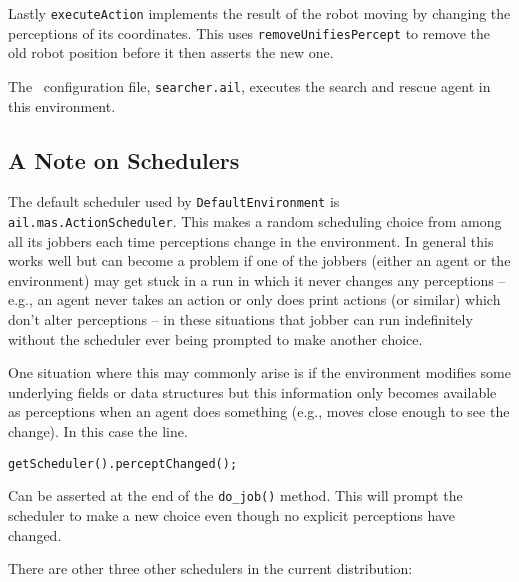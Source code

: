Lastly \texttt{executeAction} implements the result of the robot moving by changing the perceptions of its coordinates.  This uses \texttt{removeUnifiesPercept} to remove the old robot position before it then asserts the new one.

The \ail\ configuration file, \texttt{searcher.ail}, executes the search and rescue agent in this environment.

\subsection{A Note on Schedulers}

\begin{sloppypar}
The default scheduler used by \texttt{DefaultEnvironment} is \texttt{ail.mas.ActionScheduler}.  This makes a random scheduling choice from among all its jobbers each time perceptions change in the environment.  In general this works well but can become a problem if one of the jobbers (either an agent or the environment) may get stuck in a run in which it never changes any perceptions -- e.g., an agent never takes an action or only does print actions (or similar) which don't alter perceptions -- in these situations that jobber can run indefinitely without the scheduler ever being prompted to make another choice.
\end{sloppypar}

One situation where this may commonly arise is if the environment modifies some underlying fields or data structures but this information only becomes available as perceptions when an agent does something (e.g., moves close enough to see the change).  In this case the line.
\begin{verbatim}
getScheduler().perceptChanged();
\end{verbatim}
Can be asserted at the end of the \texttt{do\_job()} method.  This will prompt the scheduler to make a new choice even though no explicit perceptions have changed.

There are other three other schedulers in the current distribution:

